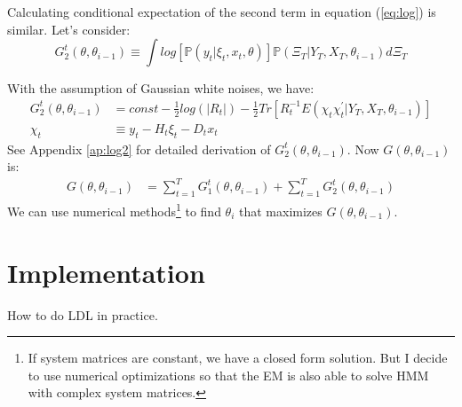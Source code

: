 \documentclass[12pt]{article}
\numberwithin{equation}{section}
\begin{document}
Calculating conditional expectation of the second term in equation (\ref{eq:log}) is similar. Let's consider:
\[
    G_2^t(\theta,\theta_{i-1}) \equiv \int log[\mathbb{P}(y_t|\xi_{t},x_t, \theta)]\mathbb{P}(\Xi_T|Y_T,X_T,\theta_{i-1})d\Xi_T 
\]

With the assumption of Gaussian white noises, we have:
\begin{align}
    G_2^t(\theta,\theta_{i-1}) &= const - \frac{1}{2}log(|R_t|)-\frac{1}{2}Tr[R_t^{-1}E(\chi_t\chi_t^{'}|Y_T,X_T,\theta_{i-1})] \label{eq:log2_trace} \\
    \chi_t &\equiv y_t - H_t\xi_t - D_tx_t \nonumber
\end{align}
See Appendix \ref{ap:log2} for detailed derivation of $G_2^t(\theta,\theta_{i-1})$. Now $G(\theta,\theta_{i-1})$ is:
\begin{align}
    G(\theta,\theta_{i-1}) &= \sum_{t=1}^{T}G_1^t(\theta,\theta_{i-1}) + \sum_{t=1}^{T}G_2^t(\theta,\theta_{i-1}) \label{eq:final_mle}
\end{align}
We can use numerical methods\footnote{If system matrices are constant, we have a closed form solution. But I decide to use numerical optimizations so that the EM is also able to solve HMM with complex system matrices.} to find $\theta_i$ that maximizes $G(\theta,\theta_{i-1})$.

\section{Implementation} \label{sec:implement}
How to do LDL in practice.
\end{document}
